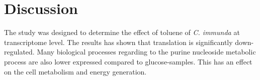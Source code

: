 \documentclass[12pt, a4paper]{report}
\begin{document}
%



\newpage
\setcounter{chapter}{4}\setcounter{section}{0}
\chapter*{Discussion}
The study was designed to determine the effect of toluene of \textit{C. immunda} at transcriptome level. The results has shown that translation is significantly down-regulated. Many biological processes regarding to the purine nucleoside metabolic process are also lower expressed compared to glucose-samples. This has an effect on the cell metabolism and energy generation. \\
\end{document}
